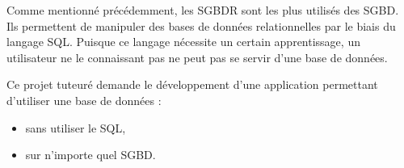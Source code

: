 Comme mentionné précédemment, les SGBDR sont les plus utilisés des SGBD. Ils permettent de manipuler des bases de données relationnelles
par le biais du langage SQL. Puisque ce langage nécessite un certain apprentissage, un utilisateur ne le connaissant pas ne peut pas se servir
d'une base de données.

Ce projet tuteuré demande le développement d'une application permettant d'utiliser une base de données :
\begin{itemize}
\item sans utiliser le SQL,
\item sur n'importe quel SGBD.
\end{itemize}
